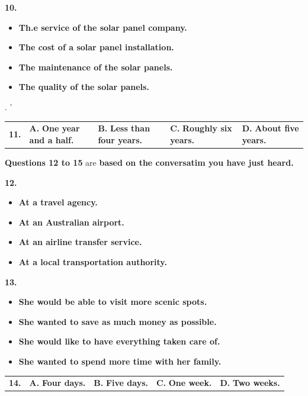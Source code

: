 \documentclass[UTF8,11pt]{ctexart}
\begin{document}
\textbf{10.}


\begin{itemize}[leftmargin=2em,itemsep=.2em,topsep=.4em]\item[A.] \textbf{Th.e service of the solar panel company.}
\item[B.] \textbf{The cost of a solar panel installation.}
\item[C.] \textbf{The maintenance of the solar panels.}
\item[D.] \textbf{The quality of the solar panels.}
\end{itemize}

. '


\noindent\begin{tabularx}{\linewidth}{@{}lXXXX@{}}\textbf{11.} & \textbf{A.} \textbf{One year and a half.} & \textbf{B.} \textbf{Less than four years.} & \textbf{C.} \textbf{Roughly six years.} & \textbf{D.} \textbf{About five years.}\\\end{tabularx}\par

\textbf{Questions 12 to 15 }are \textbf{based on the conversatim you have just heard.}


\textbf{12.}


\begin{itemize}[leftmargin=2em,itemsep=.2em,topsep=.4em]\item[A.] \textbf{At a travel agency.}
\item[B.] \textbf{At an Australian airport.}
\item[C.] \textbf{At an airline transfer service.}
\item[D.] \textbf{At a local transportation authority.}
\end{itemize}

\textbf{13.}


\begin{itemize}[leftmargin=2em,itemsep=.2em,topsep=.4em]\item[A.] \textbf{She would be able to visit more scenic spots.}
\item[B.] \textbf{She wanted to save as much money as possible.}
\item[C.] \textbf{She would like to have everything taken care of.}
\item[D.] \textbf{She wanted to spend more time with her family.}
\end{itemize}

\noindent\begin{tabularx}{\linewidth}{@{}lXXXX@{}}\textbf{14.} & \textbf{A.} \textbf{Four days.} & \textbf{B.} \textbf{Five days.} & \textbf{C.} \textbf{One week.} & \textbf{D.} \textbf{Two weeks.}\\\end{tabularx}\par
\end{document}
